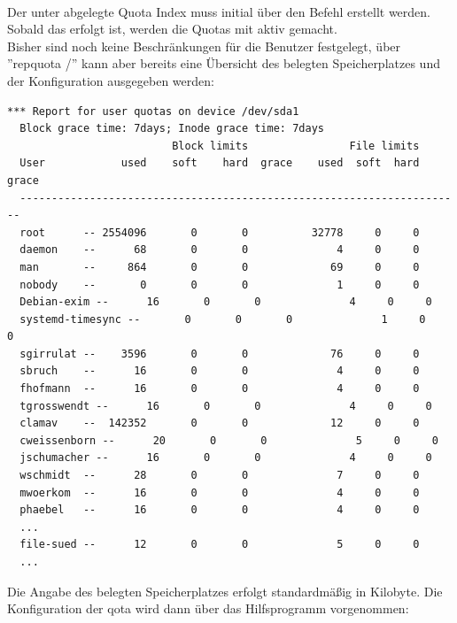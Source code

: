 \\

Der unter  abgelegte Quota Index muss initial über den
Befehl  erstellt werden. Sobald das erfolgt ist, werden
die Quotas mit  aktiv gemacht.\\

Bisher sind noch keine Beschränkungen für die Benutzer festgelegt, über
''repquota /'' kann aber bereits eine Übersicht des belegten Speicherplatzes
und der Konfiguration ausgegeben werden:\\

\begin{lstlisting}[label=code:quota1,caption=Quotasetup]
  *** Report for user quotas on device /dev/sda1
  Block grace time: 7days; Inode grace time: 7days
                          Block limits                File limits
  User            used    soft    hard  grace    used  soft  hard  grace
  ----------------------------------------------------------------------
  root      -- 2554096       0       0          32778     0     0
  daemon    --      68       0       0              4     0     0
  man       --     864       0       0             69     0     0
  nobody    --       0       0       0              1     0     0
  Debian-exim --      16       0       0              4     0     0
  systemd-timesync --       0       0       0              1     0     0
  sgirrulat --    3596       0       0             76     0     0
  sbruch    --      16       0       0              4     0     0
  fhofmann  --      16       0       0              4     0     0
  tgrosswendt --      16       0       0              4     0     0
  clamav    --  142352       0       0             12     0     0
  cweissenborn --      20       0       0              5     0     0
  jschumacher --      16       0       0              4     0     0
  wschmidt  --      28       0       0              7     0     0
  mwoerkom  --      16       0       0              4     0     0
  phaebel   --      16       0       0              4     0     0
  ...
  file-sued --      12       0       0              5     0     0
  ...
\end{lstlisting}

Die Angabe des belegten Speicherplatzes erfolgt standardmäßig in Kilobyte. Die
Konfiguration der qota wird dann über das Hilfsprogramm 
vorgenommen:\\

